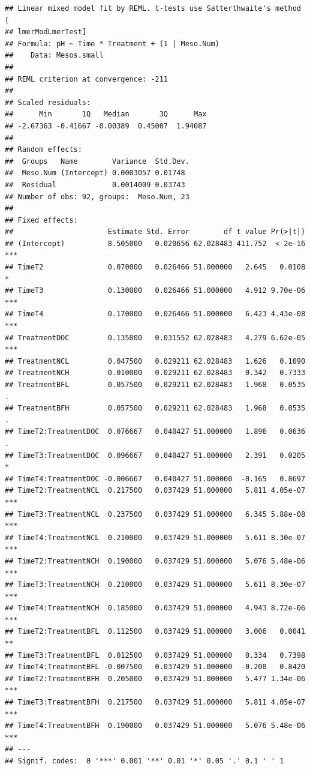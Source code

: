 \documentclass[
]{article}
\begin{document}
\begin{verbatim}
## Linear mixed model fit by REML. t-tests use Satterthwaite's method [
## lmerModLmerTest]
## Formula: pH ~ Time * Treatment + (1 | Meso.Num)
##    Data: Mesos.small
## 
## REML criterion at convergence: -211
## 
## Scaled residuals: 
##      Min       1Q   Median       3Q      Max 
## -2.67363 -0.41667 -0.00389  0.45007  1.94087 
## 
## Random effects:
##  Groups   Name        Variance  Std.Dev.
##  Meso.Num (Intercept) 0.0003057 0.01748 
##  Residual             0.0014009 0.03743 
## Number of obs: 92, groups:  Meso.Num, 23
## 
## Fixed effects:
##                      Estimate Std. Error        df t value Pr(>|t|)    
## (Intercept)          8.505000   0.020656 62.028483 411.752  < 2e-16 ***
## TimeT2               0.070000   0.026466 51.000000   2.645   0.0108 *  
## TimeT3               0.130000   0.026466 51.000000   4.912 9.70e-06 ***
## TimeT4               0.170000   0.026466 51.000000   6.423 4.43e-08 ***
## TreatmentDOC         0.135000   0.031552 62.028483   4.279 6.62e-05 ***
## TreatmentNCL         0.047500   0.029211 62.028483   1.626   0.1090    
## TreatmentNCH         0.010000   0.029211 62.028483   0.342   0.7333    
## TreatmentBFL         0.057500   0.029211 62.028483   1.968   0.0535 .  
## TreatmentBFH         0.057500   0.029211 62.028483   1.968   0.0535 .  
## TimeT2:TreatmentDOC  0.076667   0.040427 51.000000   1.896   0.0636 .  
## TimeT3:TreatmentDOC  0.096667   0.040427 51.000000   2.391   0.0205 *  
## TimeT4:TreatmentDOC -0.006667   0.040427 51.000000  -0.165   0.8697    
## TimeT2:TreatmentNCL  0.217500   0.037429 51.000000   5.811 4.05e-07 ***
## TimeT3:TreatmentNCL  0.237500   0.037429 51.000000   6.345 5.88e-08 ***
## TimeT4:TreatmentNCL  0.210000   0.037429 51.000000   5.611 8.30e-07 ***
## TimeT2:TreatmentNCH  0.190000   0.037429 51.000000   5.076 5.48e-06 ***
## TimeT3:TreatmentNCH  0.210000   0.037429 51.000000   5.611 8.30e-07 ***
## TimeT4:TreatmentNCH  0.185000   0.037429 51.000000   4.943 8.72e-06 ***
## TimeT2:TreatmentBFL  0.112500   0.037429 51.000000   3.006   0.0041 ** 
## TimeT3:TreatmentBFL  0.012500   0.037429 51.000000   0.334   0.7398    
## TimeT4:TreatmentBFL -0.007500   0.037429 51.000000  -0.200   0.8420    
## TimeT2:TreatmentBFH  0.205000   0.037429 51.000000   5.477 1.34e-06 ***
## TimeT3:TreatmentBFH  0.217500   0.037429 51.000000   5.811 4.05e-07 ***
## TimeT4:TreatmentBFH  0.190000   0.037429 51.000000   5.076 5.48e-06 ***
## ---
## Signif. codes:  0 '***' 0.001 '**' 0.01 '*' 0.05 '.' 0.1 ' ' 1
\end{verbatim}
\end{document}
